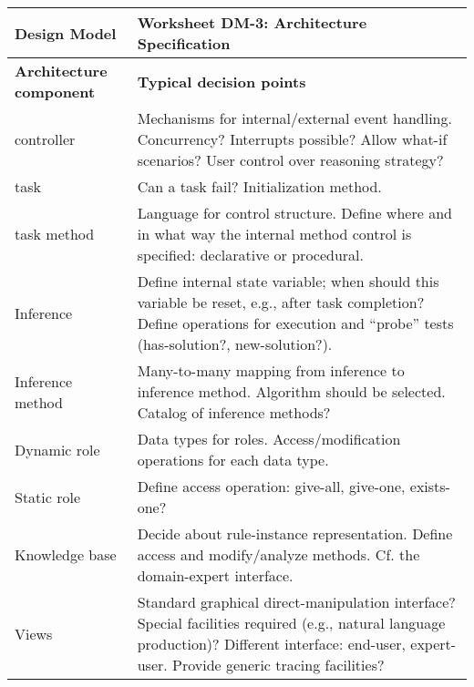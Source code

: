 \begin{tabular}{%
	|>{\colleft}p{3cm}%
	|>{\colleft}p{8cm}|}
\hline
\bf Design Model 	& \bf Worksheet DM-3: Architecture Specification \\
\hline\hline
\bf Architecture component & \bf Typical decision points 
\\ \hline
\sc controller & 
Mechanisms for internal/external event handling.
Concurrency? Interrupts possible? Allow what-if scenarios? 
User control over reasoning strategy? 
\\ \hline
\sc task & Can a task fail? Initialization method.
\\ \hline
\sc task method &
Language for control structure. Define where and in what way
the internal method control is specified:
declarative or procedural.
\\ \hline
\sc Inference & 
Define internal state variable; when should this
variable be reset, e.g., after task completion? Define operations for
execution and ``probe'' tests (has-solution?, new-solution?).
\\ \hline
\sc Inference method &
Many-to-many mapping from inference to inference method. Algorithm
should be selected. Catalog of inference methods?
\\ \hline
\sc Dynamic role &
Data types for roles. Access/modification operations for each data
type. 
\\ \hline
\sc Static role &
Define access operation: give-all, give-one, exists-one?
\\ \hline
\sc Knowledge base &
Decide about rule-instance representation. Define access and
modify/analyze methods. Cf. the domain-expert interface.
\\ \hline
\sc Views &
Standard graphical direct-manipulation interface? Special facilities
required (e.g., natural language production)? Different interface:
end-user, expert-user. Provide generic tracing facilities?
\\ \hline
\end{tabular}
